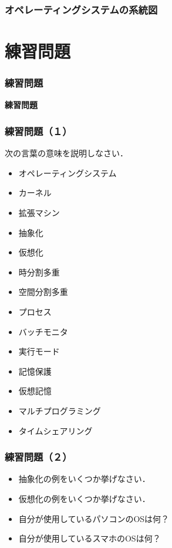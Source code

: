\documentclass[handout]{beamer}                   %
\begin{document}
\begin{frame}
  \frametitle{オペレーティングシステムの系統図}
  \vfill
\end{frame}

\section{練習問題}
\begin{frame}
  \frametitle{練習問題}
  \vfill
  \begin{center}
    \textbf{\Huge 練習問題}
  \end{center}
  \vfill
\end{frame}

\begin{frame}
  \frametitle{練習問題（１）}
  次の言葉の意味を説明しなさい．
  \begin{itemize}
    \item オペレーティングシステム
    \item カーネル
    \item 拡張マシン
    \item 抽象化
    \item 仮想化
    \item 時分割多重
    \item 空間分割多重
    \item プロセス
    \item バッチモニタ
    \item 実行モード
    \item 記憶保護
    \item 仮想記憶
    \item マルチプログラミング
    \item タイムシェアリング
  \end{itemize}
  \vfill
\end{frame}

\begin{frame}
  \frametitle{練習問題（２）}
  \begin{itemize}
    \item 抽象化の例をいくつか挙げなさい．
      \vfill
    \item 仮想化の例をいくつか挙げなさい．
      \vfill
    \item 自分が使用しているパソコンのOSは何？
      \vfill
    \item 自分が使用しているスマホのOSは何？
      \vfill
  \end{itemize}
  \vfill
\end{frame}
\end{document}
